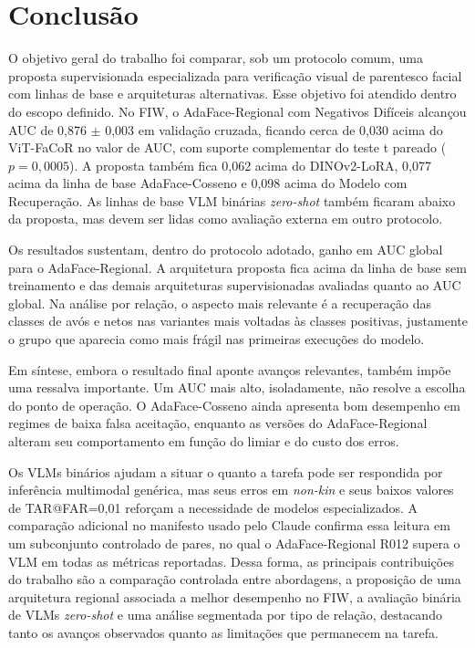 \section{Conclusão}

O objetivo geral do trabalho foi comparar, sob um protocolo comum, uma proposta supervisionada especializada para verificação visual de parentesco facial com linhas de base e arquiteturas alternativas. Esse objetivo foi atendido dentro do escopo definido. No FIW, o AdaFace-Regional com Negativos Difíceis alcançou AUC de 0,876 $\pm$ 0,003 em validação cruzada, ficando cerca de 0,030 acima do ViT-FaCoR no valor de AUC, com suporte complementar do teste t pareado ($p=0{,}0005$). A proposta também fica 0,062 acima do DINOv2-LoRA, 0,077 acima da linha de base AdaFace-Cosseno e 0,098 acima do Modelo com Recuperação. As linhas de base VLM binárias \textit{zero-shot} também ficaram abaixo da proposta, mas devem ser lidas como avaliação externa em outro protocolo.

Os resultados sustentam, dentro do protocolo adotado, ganho em AUC global para o AdaFace-Regional. A arquitetura proposta fica acima da linha de base sem treinamento e das demais arquiteturas supervisionadas avaliadas quanto ao AUC global. Na análise por relação, o aspecto mais relevante é a recuperação das classes de avós e netos nas variantes mais voltadas às classes positivas, justamente o grupo que aparecia como mais frágil nas primeiras execuções do modelo.

Em síntese, embora o resultado final aponte avanços relevantes, também impõe uma ressalva importante. Um AUC mais alto, isoladamente, não resolve a escolha do ponto de operação. O AdaFace-Cosseno ainda apresenta bom desempenho em regimes de baixa falsa aceitação, enquanto as versões do AdaFace-Regional alteram seu comportamento em função do limiar e do custo dos erros.

Os VLMs binários ajudam a situar o quanto a tarefa pode ser respondida por inferência multimodal genérica, mas seus erros em \textit{non-kin} e seus baixos valores de TAR@FAR=0{,}01 reforçam a necessidade de modelos especializados. A comparação adicional no manifesto usado pelo Claude confirma essa leitura em um subconjunto controlado de pares, no qual o AdaFace-Regional R012 supera o VLM em todas as métricas reportadas. Dessa forma, as principais contribuições do trabalho são a comparação controlada entre abordagens, a proposição de uma arquitetura regional associada a melhor desempenho no FIW, a avaliação binária de VLMs \textit{zero-shot} e uma análise segmentada por tipo de relação, destacando tanto os avanços observados quanto as limitações que permanecem na tarefa.
